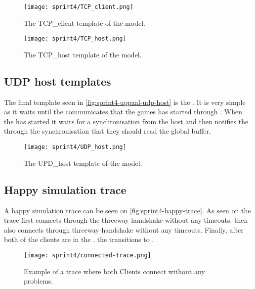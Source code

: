 \begin{figure}[h]
    \centering
    \texttt{[image: sprint4/TCP\_client.png]}
    \caption{The TCP\_client template of the \uppaal model.}
    \label{fig:sprint4-uppaal-tcp-client}
\end{figure}

\begin{figure}[h]
    \centering
    \texttt{[image: sprint4/TCP\_host.png]}
    \caption{The TCP\_host template of the \uppaal model.}
    \label{fig:sprint4-uppaal-tcp-host}
\end{figure}

\subsection{UDP host templates}
The final template seen in \autoref{fig:sprint4-uppaal-udp-host} is the .
It is very simple as it waits until the  communicates that the games has started through .
When the  has started it waits for a  synchronisation from the host and then notifies the  through the  synchronisation that they should read the global buffer.
\begin{figure}[h]
    \centering
    \texttt{[image: sprint4/UDP\_host.png]}
    \caption{The UPD\_host template of the \uppaal model.}
    \label{fig:sprint4-uppaal-udp-host}
\end{figure}

\subsection{Happy simulation trace}
A happy simulation trace can be seen on \autoref{fig:sprint4-happy-trace}.
As seen on the trace  first connects through the threeway handshake without any timeouts.
 then also connects through threeway handshake without any timeouts.
Finally, after both of the clients are in the , the  transitions to .
\begin{figure}[h]
    \centering
    \texttt{[image: sprint4/connected-trace.png]}
    \caption{Example of a trace where both Clients connect without any problems.}
    \label{fig:sprint4-happy-trace}
\end{figure}

